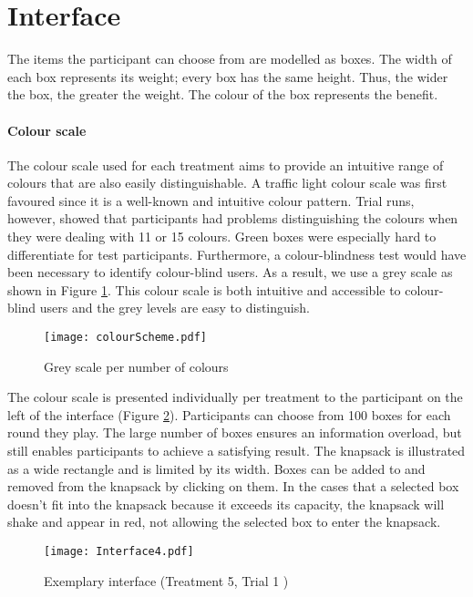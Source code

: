 \section{Interface}
\label{ch:Experiment:sec:Interface}
The items the participant can choose from are modelled as boxes. The width of each box represents its weight; every box has the same height. Thus, the wider the box, the greater the weight. 
The colour of the box represents the benefit.

\paragraph{Colour scale}
The colour scale used for each treatment aims to provide an intuitive range of colours that are also easily distinguishable. A traffic light colour scale was first favoured  since it is a well-known and intuitive colour pattern. Trial runs, however, showed that participants had problems distinguishing the colours when they were dealing with 11 or 15 colours. Green boxes were especially hard to differentiate for test participants. Furthermore, a colour-blindness test would have been necessary to identify colour-blind users.
As a result, we use a grey scale as shown in Figure \ref{fig:colourScheme}. This colour scale is both intuitive and accessible to colour-blind users and the grey levels are easy to distinguish.\\
\begin{figure}[htp] %
\begin{center}
  \texttt{[image: colourScheme.pdf]}
\caption{Grey scale per number of colours}
\label{fig:colourScheme}
\end{center}
\end{figure} 

The colour scale is presented individually per treatment to the participant on the left of the interface (Figure \ref{fig:Interface}).
Participants can choose from 100 boxes for each round they play. The large number of boxes ensures an information overload, but still enables participants to achieve a satisfying result.
The knapsack is illustrated as a wide rectangle and is limited by its width. Boxes can be added to and removed from the knapsack by clicking on them. In the cases that a selected box doesn't fit into the knapsack because it exceeds its capacity, the knapsack will shake and appear in red, not allowing the selected box to enter the knapsack. 
 \begin{figure}[htp] %
\begin{center} %
  \texttt{[image: Interface4.pdf]}
\caption{Exemplary interface (Treatment 5, Trial 1 )}
\end{center}
\label{fig:Interface}
\end{figure} 
